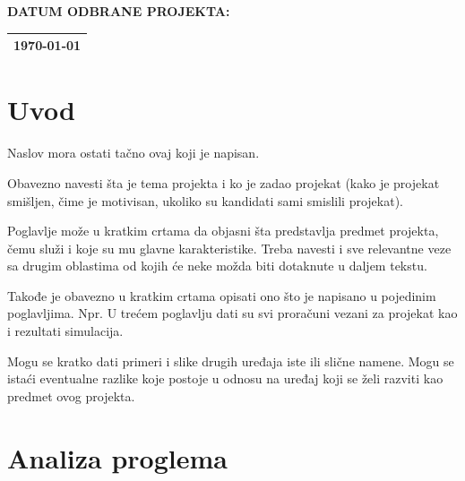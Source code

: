 \documentclass[a4paper, 12pt]{article}
\begin{document}
\begin{titlepage}
\begin{table}[H]
\vspace{0.5cm}

\textbf{DATUM ODBRANE PROJEKTA:}\\[7pt]
\begin{tabular}{|p{16cm}|}
\hline
\setlength\parindent{10pt}
\today \\
\hline
\end{tabular}
\end{table}
\end{titlepage}

\tableofcontents
\pagebreak

\section{Uvod}

\vspace{10pt}

Naslov mora ostati tačno ovaj koji je napisan.

\vspace{10pt}

Obavezno navesti šta je tema projekta i ko je zadao projekat (kako je projekat smišljen, čime je motivisan, ukoliko su kandidati sami smislili projekat).

\vspace{10pt}

Poglavlje može u kratkim crtama da objasni šta predstavlja predmet projekta, čemu služi i koje su mu glavne karakteristike. Treba navesti i sve relevantne veze sa drugim oblastima od kojih će neke možda biti dotaknute u daljem tekstu.

\vspace{10pt}

Takođe je obavezno u kratkim crtama opisati ono što je napisano u pojedinim poglavljima. Npr. 
U trećem poglavlju dati su svi proračuni vezani za projekat kao i rezultati simulacija.

\vspace{10pt}

Mogu se kratko dati primeri i slike drugih uređaja iste ili slične namene. Mogu se istaći eventualne razlike koje postoje u odnosu na uređaj koji se želi razviti kao predmet ovog projekta.

\pagebreak

\section{Analiza proglema}
\end{document}
